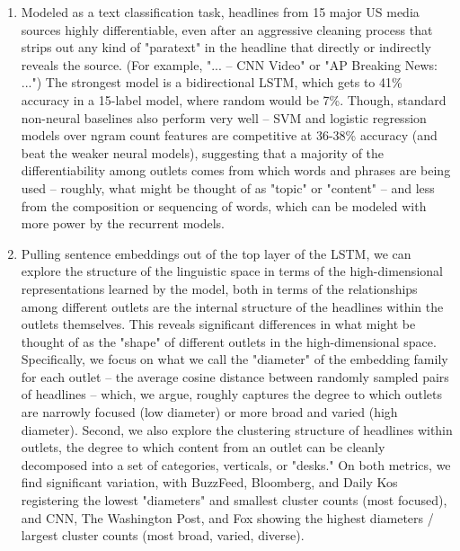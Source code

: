 \documentclass{scrartcl}
\begin{document}
\begin{enumerate}

\item Modeled as a text classification task, headlines from 15 major US media sources highly differentiable, even after an aggressive cleaning process that strips out any kind of "paratext" in the headline that directly or indirectly reveals the source. (For example, "... -- CNN Video" or "AP Breaking News: ...") The strongest model is a bidirectional LSTM, which gets to 41\% accuracy in a 15-label model, where random would be 7\%. Though, standard non-neural baselines also perform very well -- SVM and logistic regression models over ngram count features are competitive at 36-38\% accuracy (and beat the weaker neural models), suggesting that a majority of the differentiability among outlets comes from which words and phrases are being used -- roughly, what might be thought of as "topic" or "content" -- and less from the composition or sequencing of words, which can be modeled with more power by the recurrent models.

\item Pulling sentence embeddings out of the top layer of the LSTM, we can explore the structure of the linguistic space in terms of the high-dimensional representations learned by the model, both in terms of the relationships among different outlets are the internal structure of the headlines within the outlets themselves. This reveals significant differences in what might be thought of as the "shape" of different outlets in the high-dimensional space. Specifically, we focus on what we call the "diameter" of the embedding family for each outlet -- the average cosine distance between randomly sampled pairs of headlines -- which, we argue, roughly captures the degree to which outlets are narrowly focused (low diameter) or more broad and varied (high diameter). Second, we also explore the clustering structure of headlines within outlets, the degree to which content from an outlet can be cleanly decomposed into a set of categories, verticals, or "desks." On both metrics, we find significant variation, with BuzzFeed, Bloomberg, and Daily Kos registering the lowest "diameters" and smallest cluster counts (most focused), and CNN, The Washington Post, and Fox showing the highest diameters / largest cluster counts (most broad, varied, diverse).


\end{enumerate}
\end{document}
